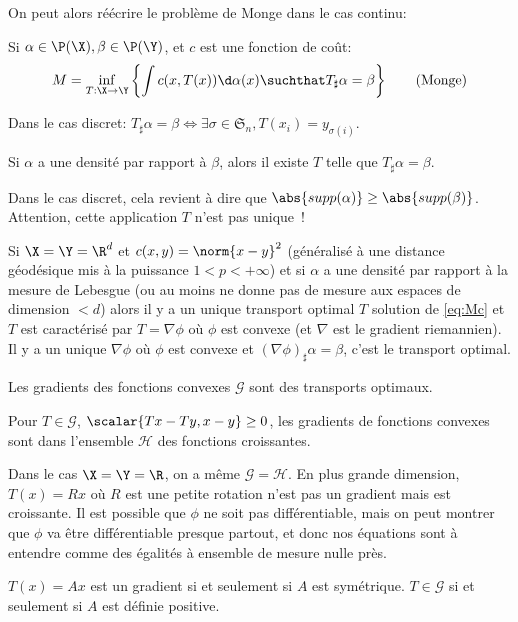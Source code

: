 \documentclass[info, math, french]{mpb-cours}
\begin{document}
On peut alors réécrire le problème de Monge dans le cas continu:
\begin{definition}
	Si $\alpha \in \P(\X), \beta \in \P(\Y)$, et $c$ est une fonction de coût:
	\begin{equation}
		M = \inf_{T : \X \to \Y} \left\{\int c(x, T(x)) \d\alpha(x)\suchthat T_{\sharp}\alpha = \beta\right\}  \tag{Monge}\label{eq:Mc}
	\end{equation}
\end{definition}

\begin{proposition}
	Dans le cas discret: $T_{\sharp}\alpha = \beta \Leftrightarrow \exists \sigma \in \mathfrak{S}_{n}, T(x_{i}) = y_{\sigma(i)}$.
\end{proposition}

\begin{thm}
	Si $\alpha$ a une densité par rapport à $\beta$, alors il existe $T$ telle que $T_{\sharp}\alpha = \beta$.
\end{thm}
\begin{remarque}
	Dans le cas discret, cela revient à dire que $\abs{supp(\alpha)} \geq \abs{supp(\beta)}$.
	Attention, cette application $T$ n'est pas unique~!
\end{remarque}

\begin{thm}[Brenier, 1991]
	Si $\X = \Y = \R^{d}$ et $c(x, y) = \norm{x - y}^{2}$
	(généralisé à une distance géodésique mis à la puissance $1 < p < +\infty$)
	et si $\alpha$ a une densité par rapport à la mesure de Lebesgue
	(ou au moins ne donne pas de mesure aux espaces de dimension $< d$) alors il y a un unique
	transport optimal $T$ solution de \eqref{eq:Mc} et $T$ est caractérisé par $T = \nabla \phi$
	où $\phi$ est convexe (et $\nabla$ est le gradient riemannien).
	Il y a un unique $\nabla \phi$ où $\phi$ est convexe et $(\nabla \phi)_{\sharp}\alpha = \beta$, c'est
	le transport optimal.
\end{thm}
\begin{corollaire}
	Les gradients des fonctions convexes $\mathcal{G}$ sont des transports optimaux.
\end{corollaire}

\begin{proposition}
	Pour $T \in \mathcal{G}$, $\scalar{Tx - Ty, x - y} \geq 0$, les gradients de fonctions convexes sont dans l'ensemble $\mathcal{H}$ des fonctions croissantes.
\end{proposition}

Dans le cas $\X = \Y = \R$, on a même $\mathcal{G} = \mathcal{H}$.
En plus grande dimension, $T(x) = Rx$ où $R$ est une petite rotation n'est pas un gradient mais est croissante.
Il est possible que $\phi$ ne soit pas différentiable, mais on peut montrer que $\phi$ va être différentiable presque partout, et donc nos équations sont à entendre comme des égalités à ensemble de mesure nulle près.
\begin{proposition}
	$T(x) = Ax$ est un gradient si et seulement si $A$ est symétrique. $T \in \mathcal{G}$ si et seulement si $A$ est définie positive.
\end{proposition}
\end{document}
